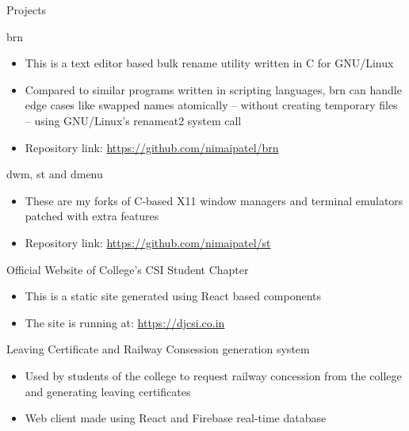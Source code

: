 \documentclass{article}
\newlength{\tabin}
\newlength{\secsep}
\newcommand{\lineunder}{\vspace*{-8pt} \\ \hspace*{-6pt} \hrulefill \\ \vspace*{-15pt}}
\newenvironment{tabbedsection}[1]{
	\begin{list}{}{
		\setlength{\itemsep}{0pt}
		\setlength{\labelsep}{0pt}
		\setlength{\labelwidth}{0pt}
		\setlength{\leftmargin}{\tabin}
		\setlength{\rightmargin}{\tabin}
		\setlength{\listparindent}{0pt}
		\setlength{\parsep}{0pt}
		\setlength{\parskip}{0pt}
		\setlength{\partopsep}{0pt}
		\setlength{\topsep}{#1}
	}
	\item[]
}{\end{list}}
\newenvironment{resume_section}[1]{
	\filbreak
	\vspace{2\secsep}
	\textsc{\large#1}
	\lineunder
	\begin{tabbedsection}{\secsep}
}{\end{tabbedsection}}
\newenvironment{resume_subsection}[2][]{
	\textbf{#2} \hfill {\footnotesize #1} \hspace{2em}
	\begin{tabbedsection}{0.5\secsep}
}{\end{tabbedsection}}
\newenvironment{subitems}{
	\renewcommand{\labelitemi}{-}
	\begin{itemize}
		\setlength{\labelsep}{1em}
}{\end{itemize}}
\begin{document}
\begin{resume_section}{Projects}

	\begin{resume_subsection}{brn}
		\begin{subitems}
			\item This is a text editor based bulk rename utility
				written in C for GNU/Linux
			\item Compared to similar programs written in scripting
				languages, brn can handle edge cases like
				swapped names atomically -- without creating
				temporary files -- using GNU/Linux's renameat2
				system call
			\item Repository link: \href{https://github.com/nimaipatel/brn}{https://github.com/nimaipatel/brn}
		\end{subitems}
	\end{resume_subsection}

	\begin{resume_subsection}{dwm, st and dmenu}
		\begin{subitems}
			\item These are my forks of C-based X11 window managers and terminal emulators patched with extra features
			\item Repository link: \href{https://github.com/nimaipatel/st}{https://github.com/nimaipatel/st}
		\end{subitems}
	\end{resume_subsection}

	\begin{resume_subsection}{Official Website of College's CSI Student Chapter}
		\begin{subitems}
			\item This is a static site generated using React based components
			\item The site is running at: \href{https://djcsi.co.in}{https://djcsi.co.in}
		\end{subitems}
	\end{resume_subsection}

	\begin{resume_subsection}{Leaving Certificate and Railway Consession generation system}
		\begin{subitems}
			\item Used by students of the college to request
				railway concession from the college and
				generating leaving certificates
			\item Web client made using React and Firebase real-time database
		\end{subitems}
	\end{resume_subsection}


\end{resume_section}
\end{document}
